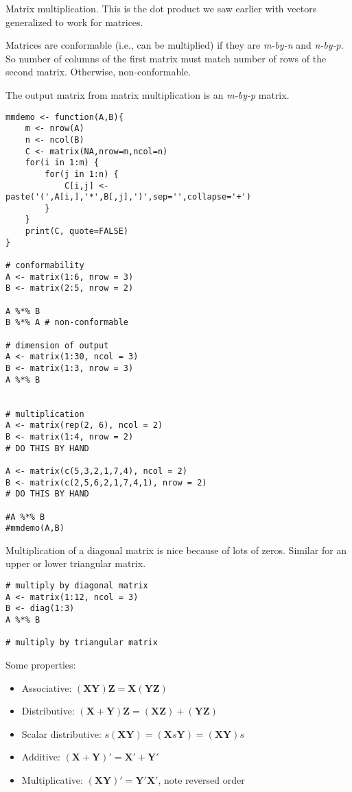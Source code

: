 \documentclass[a4paper,12pt]{article}
\newcommand{\matr}[1]{\mathbf{#1}}
\begin{document}
Matrix multiplication. This is the dot product we saw earlier with vectors generalized to work for matrices.

Matrices are conformable (i.e., can be multiplied) if they are \textit{m-by-n} and \textit{n-by-p}. So number of columns of the first matrix must match number of rows of the second matrix. Otherwise, non-conformable.

The output matrix from matrix multiplication is an \textit{m-by-p} matrix.

\begin{lstlisting}
mmdemo <- function(A,B){
    m <- nrow(A)
    n <- ncol(B)
    C <- matrix(NA,nrow=m,ncol=n)
    for(i in 1:m) {
        for(j in 1:n) {
            C[i,j] <- paste('(',A[i,],'*',B[,j],')',sep='',collapse='+')
        }
    }
    print(C, quote=FALSE)
}

# conformability
A <- matrix(1:6, nrow = 3)
B <- matrix(2:5, nrow = 2)

A %*% B
B %*% A # non-conformable

# dimension of output
A <- matrix(1:30, ncol = 3)
B <- matrix(1:3, nrow = 3)
A %*% B


# multiplication
A <- matrix(rep(2, 6), ncol = 2)
B <- matrix(1:4, nrow = 2)
# DO THIS BY HAND

A <- matrix(c(5,3,2,1,7,4), ncol = 2)
B <- matrix(c(2,5,6,2,1,7,4,1), nrow = 2)
# DO THIS BY HAND

#A %*% B
#mmdemo(A,B)

\end{lstlisting}


Multiplication of a diagonal matrix is nice because of lots of zeros. Similar for an upper or lower triangular matrix.

\begin{lstlisting}
# multiply by diagonal matrix
A <- matrix(1:12, ncol = 3)
B <- diag(1:3)
A %*% B

# multiply by triangular matrix

\end{lstlisting}

Some properties:

\begin{itemize}
\item Associative: $(\matr{X}\matr{Y})\matr{Z} = \matr{X}(\matr{Y}\matr{Z})$
\item Distributive: $(\matr{X} + \matr{Y})\matr{Z} = (\matr{X}\matr{Z}) + (\matr{Y}\matr{Z})$
\item Scalar distributive: $s(\matr{X}\matr{Y}) = (\matr{X}s\matr{Y}) = (\matr{X}\matr{Y})s$
\item Additive: $(\matr{X} + \matr{Y})' = \matr{X}' + \matr{Y}'$
\item Multiplicative: $(\matr{X}\matr{Y})' = \matr{Y}'\matr{X}'$, note reversed order
\end{itemize}
\end{document}
